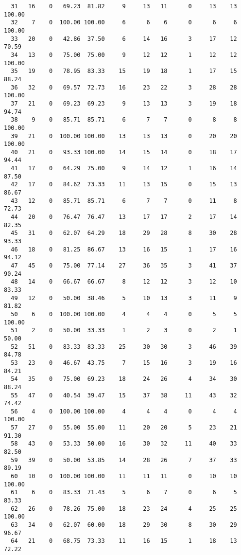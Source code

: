 \begin{verbatim}
  31   16    0   69.23  81.82     9     13   11      0     13    13   100.00
  32    7    0  100.00 100.00     6      6    6      0      6     6   100.00
  33   20    0   42.86  37.50     6     14   16      3     17    12    70.59
  34   13    0   75.00  75.00     9     12   12      1     12    12   100.00
  35   19    0   78.95  83.33    15     19   18      1     17    15    88.24
  36   32    0   69.57  72.73    16     23   22      3     28    28   100.00
  37   21    0   69.23  69.23     9     13   13      3     19    18    94.74
  38    9    0   85.71  85.71     6      7    7      0      8     8   100.00
  39   21    0  100.00 100.00    13     13   13      0     20    20   100.00
  40   21    0   93.33 100.00    14     15   14      0     18    17    94.44
  41   17    0   64.29  75.00     9     14   12      1     16    14    87.50
  42   17    0   84.62  73.33    11     13   15      0     15    13    86.67
  43   12    0   85.71  85.71     6      7    7      0     11     8    72.73
  44   20    0   76.47  76.47    13     17   17      2     17    14    82.35
  45   31    0   62.07  64.29    18     29   28      8     30    28    93.33
  46   18    0   81.25  86.67    13     16   15      1     17    16    94.12
  47   45    0   75.00  77.14    27     36   35      3     41    37    90.24
  48   14    0   66.67  66.67     8     12   12      3     12    10    83.33
  49   12    0   50.00  38.46     5     10   13      3     11     9    81.82
  50    6    0  100.00 100.00     4      4    4      0      5     5   100.00
  51    2    0   50.00  33.33     1      2    3      0      2     1    50.00
  52   51    0   83.33  83.33    25     30   30      3     46    39    84.78
  53   23    0   46.67  43.75     7     15   16      3     19    16    84.21
  54   35    0   75.00  69.23    18     24   26      4     34    30    88.24
  55   47    0   40.54  39.47    15     37   38     11     43    32    74.42
  56    4    0  100.00 100.00     4      4    4      0      4     4   100.00
  57   27    0   55.00  55.00    11     20   20      5     23    21    91.30
  58   43    0   53.33  50.00    16     30   32     11     40    33    82.50
  59   39    0   50.00  53.85    14     28   26      7     37    33    89.19
  60   10    0  100.00 100.00    11     11   11      0     10    10   100.00
  61    6    0   83.33  71.43     5      6    7      0      6     5    83.33
  62   26    0   78.26  75.00    18     23   24      4     25    25   100.00
  63   34    0   62.07  60.00    18     29   30      8     30    29    96.67
  64   21    0   68.75  73.33    11     16   15      1     18    13    72.22

\end{verbatim}
